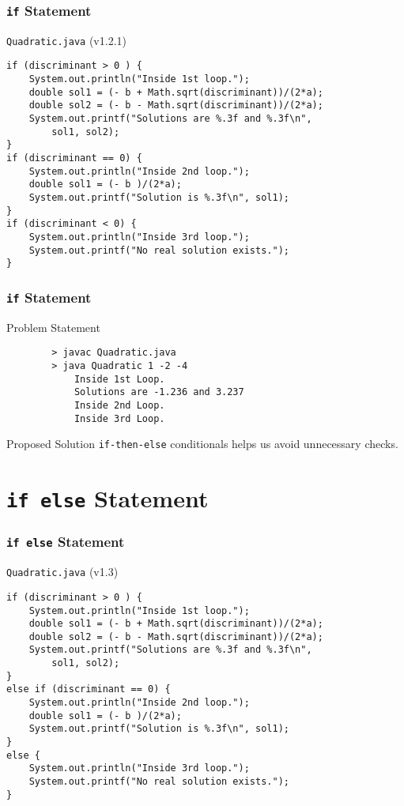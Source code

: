 \documentclass[10pt, compress]{beamer}
\begin{document}
\begin{frame}[fragile]
	\frametitle{\texttt{if} Statement}
	\begin{block}{\texttt{Quadratic.java} (v1.2.1)}
		\begin{verbatim}
if (discriminant > 0 ) {
	System.out.println("Inside 1st loop.");
	double sol1 = (- b + Math.sqrt(discriminant))/(2*a);
	double sol2 = (- b - Math.sqrt(discriminant))/(2*a);
	System.out.printf("Solutions are %.3f and %.3f\n",
		sol1, sol2);
}
if (discriminant == 0) {
	System.out.println("Inside 2nd loop.");
	double sol1 = (- b )/(2*a);
	System.out.printf("Solution is %.3f\n", sol1);
}
if (discriminant < 0) {
	System.out.println("Inside 3rd loop.");
	System.out.printf("No real solution exists.");
}
		\end{verbatim}
	\end{block}
\end{frame}

\begin{frame}[fragile]
	\frametitle{\texttt{if} Statement}
	\begin{block}{Problem Statement}
		\begin{verbatim}
		> javac Quadratic.java
		> java Quadratic 1 -2 -4
			Inside 1st Loop.
			Solutions are -1.236 and 3.237
			Inside 2nd Loop.
			Inside 3rd Loop.
		\end{verbatim}
	\end{block}
	\begin{block}{Proposed Solution}
		\texttt{if-then-else} conditionals helps us avoid unnecessary checks.
	\end{block}
\end{frame}

\section{\texttt{if else} Statement}

\begin{frame}[fragile]
	\frametitle{\texttt{if else} Statement}
	\begin{block}{\texttt{Quadratic.java} (v1.3)}
		\begin{verbatim}
if (discriminant > 0 ) {
	System.out.println("Inside 1st loop.");
	double sol1 = (- b + Math.sqrt(discriminant))/(2*a);
	double sol2 = (- b - Math.sqrt(discriminant))/(2*a);
	System.out.printf("Solutions are %.3f and %.3f\n",
		sol1, sol2);
}
else if (discriminant == 0) {
	System.out.println("Inside 2nd loop.");
	double sol1 = (- b )/(2*a);
	System.out.printf("Solution is %.3f\n", sol1);
}
else {
	System.out.println("Inside 3rd loop.");
	System.out.printf("No real solution exists.");
}
		\end{verbatim}
	\end{block}
\end{frame}
\end{document}
